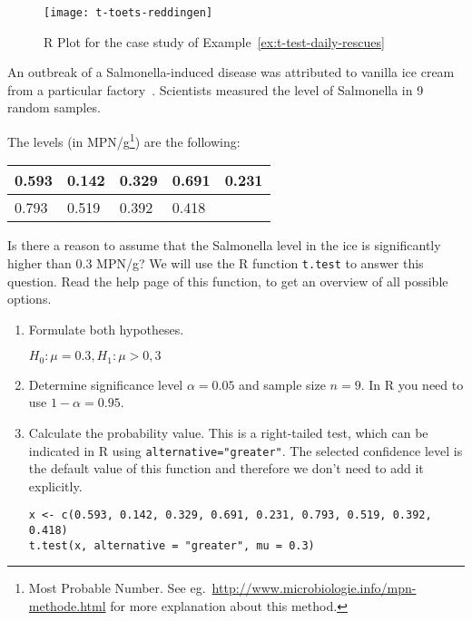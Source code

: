 \begin{figure}
  \centering
  \texttt{[image: t-toets-reddingen]}
  \caption{R Plot for the case study of Example~\ref{ex:t-test-daily-rescues}}
\end{figure}

\begin{example}
  An outbreak of a Salmonella-induced disease was attributed to vanilla ice cream from a particular factory~\autocite{Lindquist}.
  Scientists measured the level of Salmonella in 9 random samples.
  
  The levels (in MPN/g\footnote{Most Probable Number. See eg.~\url{http://www.microbiologie.info/mpn-methode.html} for more explanation about this method.}) are the following:
  
  \begin{center}
    \begin{tabular}{|l|l|l|l|l|}
      \hline
      0.593 & 0.142 & 0.329 & 0.691 & 0.231 \\ \hline
      0.793 & 0.519 & 0.392 & 0.418 &       \\ \hline
    \end{tabular}
  \end{center}

  Is there a reason to assume that the Salmonella level in the ice is significantly higher than 0.3 MPN/g? 
  We will use the R function \texttt{t.test} to answer this question.
  Read the help page of this function, to get an overview of all possible options.
  
  \begin{enumerate}
    \item Formulate both hypotheses.
    
    $H_0: \mu = 0.3, H_1: \mu > 0,3$
    
    \item Determine significance level $\alpha = 0.05$ and sample size $n = 9$. In R you need to use $1-\alpha = 0.95$.
    
    \item Calculate the probability value. This is a right-tailed test, which can be indicated in R using \texttt{alternative="greater"}. The selected confidence level is the default value of this function and therefore we don't need to add it explicitly.
    
\begin{lstlisting}
x <- c(0.593, 0.142, 0.329, 0.691, 0.231, 0.793, 0.519, 0.392, 0.418)
t.test(x, alternative = "greater", mu = 0.3)
\end{lstlisting}
    

\end{enumerate}
\end{example}
